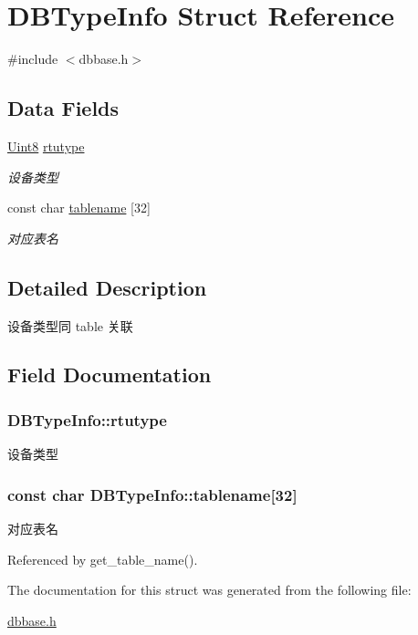 \hypertarget{structDBTypeInfo}{\section{D\-B\-Type\-Info Struct Reference}
\label{structDBTypeInfo}
}


{\ttfamily \#include $<$dbbase.\-h$>$}

\subsection*{Data Fields}
\begin{DoxyCompactItemize}
\item 
\hyperlink{base_8h_af84840501dec18061d18a68c162a8fa2}{Uint8} \hyperlink{structDBTypeInfo_a401035ba03ad53700326b398a5bcccd2}{rtutype}
\begin{DoxyCompactList}\small\item\em 设备类型 \end{DoxyCompactList}\item 
const char \hyperlink{structDBTypeInfo_a3a9028d289827ded68629db2457b3452}{tablename} \mbox{[}32\mbox{]}
\begin{DoxyCompactList}\small\item\em 对应表名 \end{DoxyCompactList}\end{DoxyCompactItemize}


\subsection{Detailed Description}
设备类型同 table 关联 

\subsection{Field Documentation}
\hypertarget{structDBTypeInfo_a401035ba03ad53700326b398a5bcccd2}{
\subsubsection[{rtutype}]{ D\-B\-Type\-Info\-::rtutype}}\label{structDBTypeInfo_a401035ba03ad53700326b398a5bcccd2}


设备类型 

\hypertarget{structDBTypeInfo_a3a9028d289827ded68629db2457b3452}{
\subsubsection[{tablename}]{\setlength{\rightskip}{0pt plus 5cm}const char D\-B\-Type\-Info\-::tablename\mbox{[}32\mbox{]}}}\label{structDBTypeInfo_a3a9028d289827ded68629db2457b3452}


对应表名 



Referenced by get\-\_\-table\-\_\-name().



The documentation for this struct was generated from the following file\-:\begin{DoxyCompactItemize}
\item 
\hyperlink{dbbase_8h}{dbbase.\-h}\end{DoxyCompactItemize}

